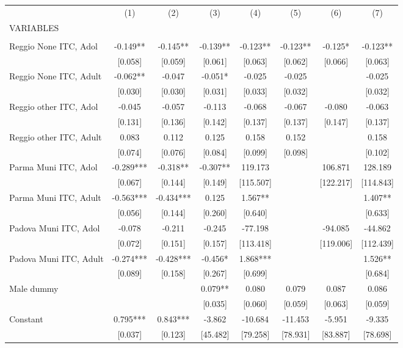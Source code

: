 \begin{tabular}{lccccccc} \hline
 & (1) & (2) & (3) & (4) & (5) & (6) & (7) \\
VARIABLES &  &  &  &  &  &  &  \\ \hline
 &  &  &  &  &  &  &  \\
Reggio None ITC, Adol & -0.149** & -0.145** & -0.139** & -0.123** & -0.123** & -0.125* & -0.123** \\
 & [0.058] & [0.059] & [0.061] & [0.063] & [0.062] & [0.066] & [0.063] \\
Reggio None ITC, Adult & -0.062** & -0.047 & -0.051* & -0.025 & -0.025 &  & -0.025 \\
 & [0.030] & [0.030] & [0.031] & [0.033] & [0.032] &  & [0.032] \\
Reggio other ITC, Adol & -0.045 & -0.057 & -0.113 & -0.068 & -0.067 & -0.080 & -0.063 \\
 & [0.131] & [0.136] & [0.142] & [0.137] & [0.137] & [0.147] & [0.137] \\
Reggio other ITC, Adult & 0.083 & 0.112 & 0.125 & 0.158 & 0.152 &  & 0.158 \\
 & [0.074] & [0.076] & [0.084] & [0.099] & [0.098] &  & [0.102] \\
Parma Muni ITC, Adol & -0.289*** & -0.318** & -0.307** & 119.173 &  & 106.871 & 128.189 \\
 & [0.067] & [0.144] & [0.149] & [115.507] &  & [122.217] & [114.843] \\
Parma Muni ITC, Adult & -0.563*** & -0.434*** & 0.125 & 1.567** &  &  & 1.407** \\
 & [0.056] & [0.144] & [0.260] & [0.640] &  &  & [0.633] \\
Padova Muni ITC, Adol & -0.078 & -0.211 & -0.245 & -77.198 &  & -94.085 & -44.862 \\
 & [0.072] & [0.151] & [0.157] & [113.418] &  & [119.006] & [112.439] \\
Padova Muni ITC, Adult & -0.274*** & -0.428*** & -0.456* & 1.868*** &  &  & 1.526** \\
 & [0.089] & [0.158] & [0.267] & [0.699] &  &  & [0.684] \\
Male dummy &  &  & 0.079** & 0.080 & 0.079 & 0.087 & 0.086 \\
 &  &  & [0.035] & [0.060] & [0.059] & [0.063] & [0.059] \\
Constant & 0.795*** & 0.843*** & -3.862 & -10.684 & -11.453 & -5.951 & -9.335 \\
 & [0.037] & [0.123] & [45.482] & [79.258] & [78.931] & [83.887] & [78.698] \\

\end{tabular}
